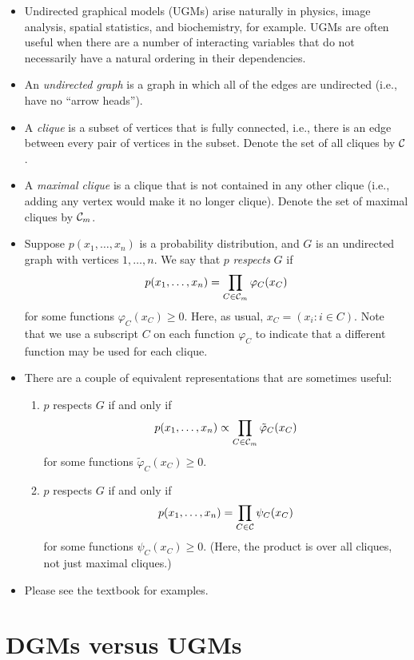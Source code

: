 \documentclass[12pt]{article}
\begin{document}
\begin{itemize}
\item Undirected graphical models (UGMs) arise naturally in physics, image analysis, spatial statistics, and biochemistry, for example. UGMs are often useful when there are a number of interacting variables that do not necessarily have a natural ordering in their dependencies.
\item An \textit{undirected graph} is a graph in which all of the edges are undirected (i.e., have no ``arrow heads'').
\item A \textit{clique} is a subset of vertices that is fully connected, i.e., there is an edge between every pair of vertices in the subset.  Denote the set of all cliques by $\mathcal{C}$.
\item A \textit{maximal clique} is a clique that is not contained in any other clique (i.e., adding any vertex would make it no longer clique). Denote the set of maximal cliques by $\mathcal{C}_m$.
\item Suppose $p(x_1,\ldots,x_n)$ is a probability distribution, and $G$ is an undirected graph with vertices $1,\ldots,n$. We say that $p$ \textit{respects} $G$ if
$$ p(x_1,\ldots,x_n) = \prod_{C \in \mathcal{C}_m} \varphi_C(x_C) $$
for some functions $\varphi_C(x_C) \geq 0$. Here, as usual, $x_C = (x_i:i \in C)$. Note that we use a subscript $C$ on each function $\varphi_C$ to indicate that a different function may be used for each clique.
\item There are a couple of equivalent representations that are sometimes useful:
\begin{enumerate}
\item $p$ respects $G$ if and only if
$$ p(x_1,\ldots,x_n) \propto \prod_{C \in \mathcal{C}_m} \tilde\varphi_C(x_C) $$
for some functions $\tilde\varphi_C(x_C) \geq 0$.
\item $p$ respects $G$ if and only if
$$ p(x_1,\ldots,x_n) = \prod_{C \in \mathcal{C}} \psi_C(x_C) $$
for some functions $\psi_C(x_C) \geq 0$. (Here, the product is over all cliques, not just maximal cliques.)
\end{enumerate}
\item Please see the textbook for examples.
\end{itemize}


\section{DGMs versus UGMs}
\end{document}
